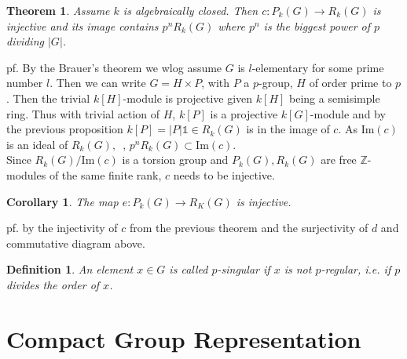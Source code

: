 \documentclass[12pt,letterpaper]{report}
\newtheorem{definition}{Definition}[section]
\newtheorem{theorem}{Theorem}[section]
\newtheorem{corollary}{Corollary}[section]
\begin{document}
\begin{theorem}Assume $k$ is algebraically closed. Then $c:P_{k}(G)\rightarrow R_{k}(G)$ is injective and its image contains $p^{n}R_{k}(G)$ where $p^{n}$ is the biggest power of $p$ dividing $|G|$.\end{theorem}
pf. By the Brauer's theorem we wlog assume $G$ is $l$-elementary for some prime number $l$. Then we can write $G=H\times P$, with $P$ a $p$-group, $H$ of order prime to $p$. Then the trivial $k[H]$-module is projective given $k[H]$ being a semisimple ring. Thus with trivial action of $H$, $k[P]$ is a projective $k[G]$-module and by the previous proposition $k[P]=|P|\mathbb{1}\in R_{k}(G)$ is in the image of $c$. As Im$(c)$ is an ideal of $R_{k}(G),\,\,\,,\,p^{n}R_{k}(G)\subset \text{Im}(c)$. 
\\Since $R_{k}(G)/\text{Im}(c)$ is a torsion group and $P_{k}(G),R_{k}(G)$ are free $\mathbb{Z}$-modules of the same finite rank, $c$ needs to be injective. 
\begin{corollary}The map $e:P_{k}(G)\rightarrow R_{K}(G)$ is injective.\end{corollary}
pf. by the injectivity of $c$ from the previous theorem and the surjectivity of $d$ and commutative diagram above.
\begin{definition}An element $x\in G$ is called $p$-singular if $x$ is not $p$-regular, i.e. if $p$ divides the order of $x$.\end{definition}


\section{Compact Group Representation}
\end{document}
